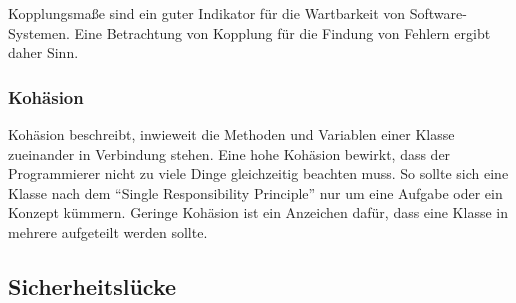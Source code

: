 Kopplungsmaße sind ein guter Indikator für die Wartbarkeit von Software-Systemen.
Eine Betrachtung von Kopplung für die Findung von Fehlern ergibt daher Sinn.

\subsubsection{Kohäsion}
Kohäsion beschreibt, inwieweit die Methoden und Variablen einer Klasse zueinander in Verbindung stehen.
Eine hohe Kohäsion bewirkt, dass der Programmierer nicht zu viele Dinge gleichzeitig beachten muss.
So sollte sich eine Klasse nach dem "`Single Responsibility Principle"' nur um eine Aufgabe oder ein Konzept kümmern.
Geringe Kohäsion ist ein Anzeichen dafür, dass eine Klasse in mehrere aufgeteilt werden sollte.

\subsection{Sicherheitslücke}



